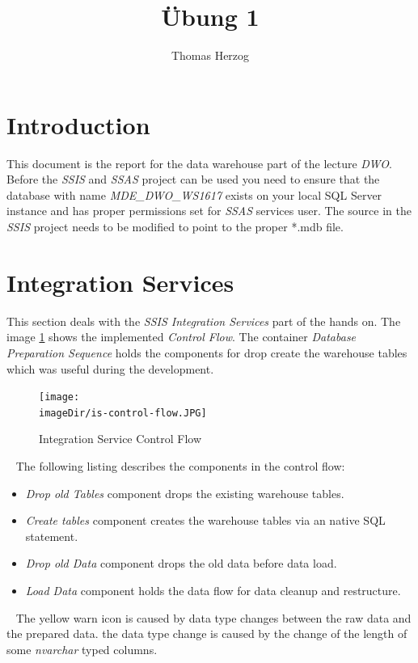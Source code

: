 \documentclass[11pt, a4paper, twoside]{article}   	%
\title{Übung 1}
\author{Thomas Herzog}
\newcommand{\imageDir}{./images/}
\begin{document}
\setlength{\headheight}{15mm}
%

\section{Introduction}
This document is the report for the data warehouse part of the lecture \emph{DWO}. Before the \emph{SSIS} and \emph{SSAS} project can be used you need to ensure that the database with name \emph{MDE\_DWO\_WS1617} exists on your local SQL Server instance and has proper permissions set for \emph{SSAS} services user. 
\newline
\newline
The source in the \emph{SSIS} project needs to be modified to point to the proper *.mdb file.

\section{Integration Services}
\label{sec:integration-services}
This section deals with the \emph{SSIS Integration Services} part of the hands on. The image \ref{fig:is-control-flow} shows the implemented \emph{Control Flow}. The container \emph{Database Preparation Sequence} holds the components for drop create the warehouse tables which was useful during the development.

\begin{figure}[h]
\centering
\texttt{[image: \\imageDir/is-control-flow.JPG]}
\caption{Integration Service Control Flow}
\label{fig:is-control-flow}
\end{figure}
\ \newline
The following listing describes the components in the control flow:
\begin{itemize}
	\item \emph{Drop old Tables} component drops the existing warehouse tables.
	\item \emph{Create tables} component creates the warehouse tables via an native SQL statement.
	\item \emph{Drop old Data} component drops the old data before data load.
	\item \emph{Load Data} component holds the data flow for data cleanup and restructure.
\end{itemize}
\ \newline
The yellow warn icon is caused by data type changes between the raw data and the prepared data. the data type change is caused by the change of the length of some \emph{nvarchar} typed columns.
\newpage
\end{document}
